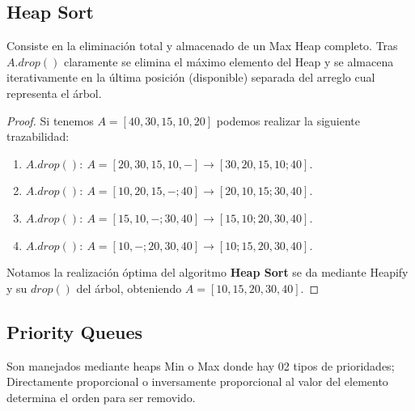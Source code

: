 \documentclass[tikz,11pt,fleqn]{book} %
\begin{document}

\subsection{Heap Sort}
Consiste en la eliminación total y almacenado de un Max Heap completo. Tras $A.drop()$ claramente se elimina el máximo elemento del Heap y se almacena iterativamente en la última posición (disponible) separada del arreglo cual representa el árbol.
\begin{proof}
	Si tenemos $A=[40,30,15,10,20]$ podemos realizar la siguiente trazabilidad:
	\begin{enumerate}
		\item $A.drop():~A=[20,30,15,10,-]
			      \to [30,20,15,10;40]$.
		\item $A.drop():~A=[10,20,15,-;40]
			      \to [20,10,15;30,40]$.
		\item $A.drop():~A=[15,10,-;30,40]
			      \to [15,10;20,30,40]$.
		\item $A.drop():~A=[10,-;20,30,40]
			      \to [10;15,20,30,40]$.
	\end{enumerate}

	Notamos la realización óptima del algoritmo \textbf{Heap Sort} se da mediante Heapify y su $drop()$ del árbol, obteniendo $A=[10,15,20,30,40]$.
\end{proof}

\subsection{Priority Queues}
Son manejados mediante heaps Min o Max donde hay 02 tipos de prioridades; Directamente proporcional o inversamente proporcional al valor del elemento determina el orden para ser removido.
\end{document}
